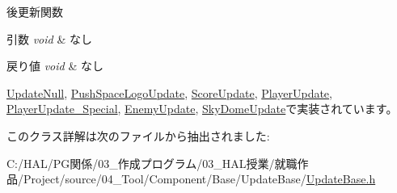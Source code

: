 後更新関数 


\begin{DoxyParams}{引数}
{\em void} & なし \\
\hline
\end{DoxyParams}

\begin{DoxyRetVals}{戻り値}
{\em void} & なし \\
\hline
\end{DoxyRetVals}


\mbox{\hyperlink{class_update_null_ac68da1ba7f3fbcae833442bb1c169200}{Update\+Null}}, \mbox{\hyperlink{class_push_space_logo_update_a4423864fb22b1211e92a4317d0b70a44}{Push\+Space\+Logo\+Update}}, \mbox{\hyperlink{class_score_update_adc9a48f54828e49c072c298777935893}{Score\+Update}}, \mbox{\hyperlink{class_player_update_ae376f517f3458edfef61ac366aa78e36}{Player\+Update}}, \mbox{\hyperlink{class_player_update___special_a1daae8fdcd87bf907313a98e022f254c}{Player\+Update\+\_\+\+Special}}, \mbox{\hyperlink{class_enemy_update_ae14e4ebb42ad9043534e53edcba5b242}{Enemy\+Update}}, \mbox{\hyperlink{class_sky_dome_update_a94347cb50b4dc13528738a7b812da261}{Sky\+Dome\+Update}}で実装されています。



このクラス詳解は次のファイルから抽出されました\+:\begin{DoxyCompactItemize}
\item 
C\+:/\+H\+A\+L/\+P\+G関係/03\+\_\+作成プログラム/03\+\_\+\+H\+A\+L授業/就職作品/\+Project/source/04\+\_\+\+Tool/\+Component/\+Base/\+Update\+Base/\mbox{\hyperlink{_update_base_8h}{Update\+Base.\+h}}\end{DoxyCompactItemize}
